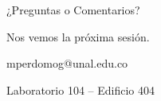 \documentclass[aspectratio=169,xcolor=dvipsnames]{beamer}
\begin{document}
	\begin{frame}{¿Preguntas o Comentarios?}
		\begin{center}
			\vspace{0.5cm}
			\Large Nos vemos la próxima sesión.
			
			\vspace{0.8cm}
			\normalsize
			mperdomog@unal.edu.co
			
			\vspace{0.2cm}
			Laboratorio 104 -- Edificio 404
		\end{center}
	\end{frame}
	
\end{document}
